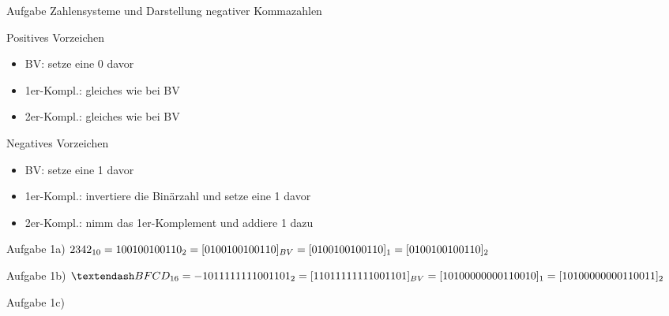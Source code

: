 \begin{frame}[allowframebreaks]{Aufgabe \thesection}{Zahlensysteme und Darstellung negativer Kommazahlen}
{        \begin{block}{Positives Vorzeichen}
            \begin{itemize}
                \item BV: setze eine 0 davor
                \item 1er-Kompl.: gleiches wie bei BV
                \item 2er-Kompl.: gleiches wie bei BV
            \end{itemize}
        \end{block}
        \begin{block}{Negatives Vorzeichen}
            \begin{itemize}
                \item BV: setze eine 1 davor
                \item 1er-Kompl.: invertiere die Binärzahl und setze eine 1 davor
                \item 2er-Kompl.: nimm das 1er-Komplement und addiere 1 dazu
            \end{itemize}
        \end{block}
    }\fi
  \begin{solution}
    Aufgabe 1a)\newline\newline
    $2342_{10} = 100100100110_2 \newline\newline = [0100100100110]_{BV} \newline\newline = [0100100100110]_{1} \newline\newline = [0100100100110]_{2}$
  \end{solution}
  \begin{solution}
    Aufgabe 1b)\newline\newline
    $–BFCD_{16} = - 1011 1111 1100 1101_2 \newline\newline = [11011 1111 1100 1101]_{BV} \newline\newline = [1 0100 0000 0011 0010]_1 \newline\newline = [1 0100 0000 0011 0011]_2$
  \end{solution}
  \begin{solution}
    Aufgabe 1c)\newline\newline

\end{solution}
\end{frame}

